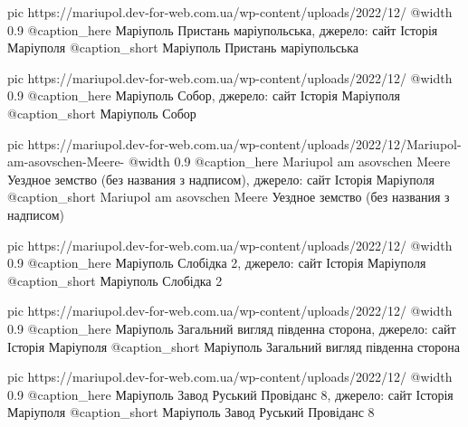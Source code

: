   pic https://mariupol.dev-for-web.com.ua/wp-content/uploads/2022/12/%
  @width 0.9
  @caption_here Маріуполь Пристань маріупольська, джерело: сайт Історія Маріуполя
  @caption_short Маріуполь Пристань маріупольська

  pic https://mariupol.dev-for-web.com.ua/wp-content/uploads/2022/12/%
  @width 0.9
  @caption_here Маріуполь Собор, джерело: сайт Історія Маріуполя
  @caption_short Маріуполь Собор

  pic https://mariupol.dev-for-web.com.ua/wp-content/uploads/2022/12/Mariupol-am-asovschen-Meere-%
  @width 0.9
  @caption_here Mariupol am asovschen Meere Уездное земство (без названия з надписом), джерело: сайт Історія Маріуполя
  @caption_short Mariupol am asovschen Meere Уездное земство (без названия з надписом)

  pic https://mariupol.dev-for-web.com.ua/wp-content/uploads/2022/12/%
  @width 0.9
  @caption_here Маріуполь Слобідка 2, джерело: сайт Історія Маріуполя
  @caption_short Маріуполь Слобідка 2

  pic https://mariupol.dev-for-web.com.ua/wp-content/uploads/2022/12/%
  @width 0.9
  @caption_here Маріуполь Загальний вигляд південна сторона, джерело: сайт Історія Маріуполя
  @caption_short Маріуполь Загальний вигляд південна сторона

  pic https://mariupol.dev-for-web.com.ua/wp-content/uploads/2022/12/%
  @width 0.9
  @caption_here Маріуполь Завод Руський Провіданс 8, джерело: сайт Історія Маріуполя
  @caption_short Маріуполь Завод Руський Провіданс 8

